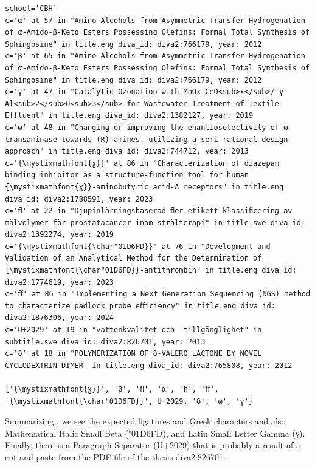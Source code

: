 \documentclass[12pt, twoside]{article}
\begin{document}
\begin{lstlisting}[style=latexExampleForAuthors,  escapechar=|, 
caption={Part of the output about characters missing from Figtree that are actually used in \gls{DiVA} in English and Swedish titles and subtitles - for the CBH school.},
label=lst:missingFigtreeCBH]
\end{lstlisting}
\begin{Verbatim}[breaklines=true, commandchars=\\\{\}]
school='CBH'
c='α' at 57 in "Amino Alcohols from Asymmetric Transfer Hydrogenation of α-Amido-β-Keto Esters Possessing Olefins: Formal Total Synthesis of Sphingosine" in title.eng diva_id: diva2:766179, year: 2012
c='β' at 65 in "Amino Alcohols from Asymmetric Transfer Hydrogenation of α-Amido-β-Keto Esters Possessing Olefins: Formal Total Synthesis of Sphingosine" in title.eng diva_id: diva2:766179, year: 2012
c='γ' at 47 in "Catalytic Ozonation with MnOx-CeO<sub>x</sub>/ γ-Al<sub>2</sub>O<sub>3</sub> for Wastewater Treatment of Textile Effluent" in title.eng diva_id: diva2:1382127, year: 2019
c='ω' at 48 in "Changing or improving the enantioselectivity of ω-transaminase towards (R)-amines, utilizing a semi-rational design approach" in title.eng diva_id: diva2:744712, year: 2013
c='{\mystixmathfont{ɣ}}' at 86 in "Characterization of diazepam binding inhibitor as a structure-function tool for human {\mystixmathfont{ɣ}}-aminobutyric acid-A receptors" in title.eng diva_id: diva2:1788591, year: 2023
c='ﬂ' at 22 in "Djupinlärningsbaserad ﬂer-etikett klassiﬁcering av målvolymer för prostatacancer inom strålterapi" in title.swe diva_id: diva2:1392274, year: 2019
c='{\mystixmathfont{\char"01D6FD}}' at 76 in "Development and Validation of an Analytical Method for the Determination of {\mystixmathfont{\char"01D6FD}}-antithrombin" in title.eng diva_id: diva2:1774619, year: 2023
c='ﬀ' at 86 in "Implementing a Next Generation Sequencing (NGS) method to characterize padlock probe eﬀiciency" in title.eng diva_id: diva2:1876306, year: 2024
c='U+2029' at 19 in "vattenkvalitet och  tillgänglighet" in subtitle.swe diva_id: diva2:826701, year: 2013
c='δ' at 18 in "POLYMERIZATION OF δ-VALERO LACTONE BY NOVEL CYCLODEXTRIN DIMER" in title.eng diva_id: diva2:765808, year: 2012

{'{\mystixmathfont{ɣ}}', 'β', 'ﬂ', 'α', 'ﬁ', 'ﬀ', '{\mystixmathfont{\char"01D6FD}}', U+2029, 'δ', 'ω', 'γ'}
\end{Verbatim}
\FloatBarrier

Summarizing , we see the expected ligatures and Greek characters and also Mathematical Italic Small Beta ({\mystixmathfont\char"01D6FD}), and Latin Small Letter Gamma ({\mystixmathfont γ}). Finally, there is a Paragraph Separator (U+2029) that is probably a result of a cut and paste from the PDF file of the thesis diva2:826701.
\clearpage
\end{document}
